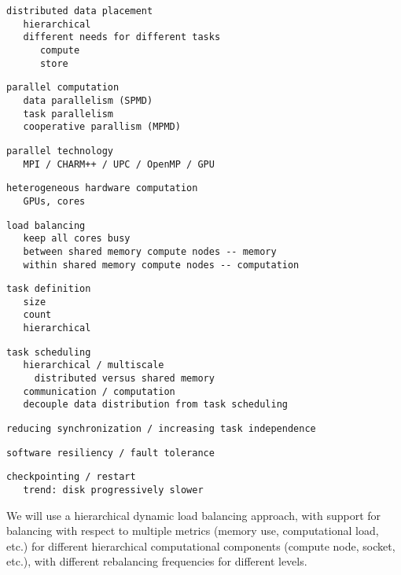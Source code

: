 \documentclass[14pt,letter]{article}
\begin{document}
\begin{verbatim}
distributed data placement
   hierarchical
   different needs for different tasks
      compute
      store
\end{verbatim}

\begin{verbatim}
parallel computation
   data parallelism (SPMD)
   task parallelism
   cooperative parallism (MPMD)
\end{verbatim}

\begin{verbatim}
parallel technology
   MPI / CHARM++ / UPC / OpenMP / GPU
\end{verbatim}

\begin{verbatim}
heterogeneous hardware computation
   GPUs, cores
\end{verbatim}

\begin{verbatim}
load balancing
   keep all cores busy
   between shared memory compute nodes -- memory
   within shared memory compute nodes -- computation
\end{verbatim}

\begin{verbatim}
task definition
   size
   count
   hierarchical
\end{verbatim}

\begin{verbatim}
task scheduling
   hierarchical / multiscale
     distributed versus shared memory
   communication / computation
   decouple data distribution from task scheduling
\end{verbatim}

\begin{verbatim}
reducing synchronization / increasing task independence
\end{verbatim}

\begin{verbatim}
software resiliency / fault tolerance
\end{verbatim}

\begin{verbatim}
checkpointing / restart
   trend: disk progressively slower
\end{verbatim}


We will use a hierarchical dynamic load balancing approach, with
support for balancing with respect to multiple metrics (memory use,
computational load, etc.) for different hierarchical computational
components (compute node, socket, etc.), with different rebalancing
frequencies for different levels.
\end{document}
